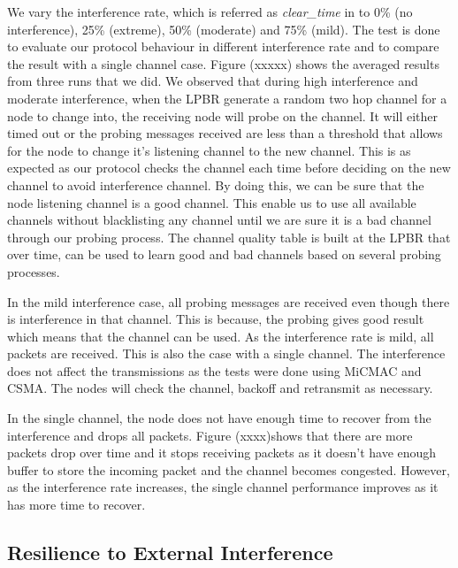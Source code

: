 We vary the interference rate, which is referred as \textit{clear\_time} in \cite{Boano:2010:MSM:2127940.2127963} to 0\% (no interference), 25\% (extreme), 50\% (moderate) and 75\% (mild). The test is done to evaluate our protocol behaviour in different interference rate and to compare the result with a single channel case. Figure (xxxxx) shows the averaged results from three runs that we did. We observed that during high interference and moderate interference, when the LPBR generate a random two hop channel for a node to change into, the receiving node will probe on the channel. It will either timed out or the probing messages received are less than a threshold that allows for the node to change it's listening channel to the new channel. This is as expected as our protocol checks the channel each time before deciding on the new channel to avoid interference channel. By doing this, we can be sure that the node listening channel is a good channel. This enable us to use all available channels without blacklisting any channel until we are sure it is a bad channel through our probing process. The channel quality table is built at the LPBR that over time, can be used to learn good and bad channels based on several probing processes. 

In the mild interference case, all probing messages are received even though there is interference in that channel. This is because, the probing gives good result which means that the channel can be used. As the interference rate is mild, all packets are received. This is also the case with a single channel. The interference does not affect the transmissions as the tests were done using MiCMAC and CSMA. The nodes will check the channel, backoff and retransmit as necessary.

In the single channel, the node does not have enough time to recover from the interference and drops all packets. Figure (xxxx)shows that there are more packets drop over time and it stops receiving packets as it doesn't have enough buffer to store the incoming packet and the channel becomes congested. However, as the interference rate increases, the single channel performance improves as it has more time to recover.



\subsection{Resilience to External Interference}